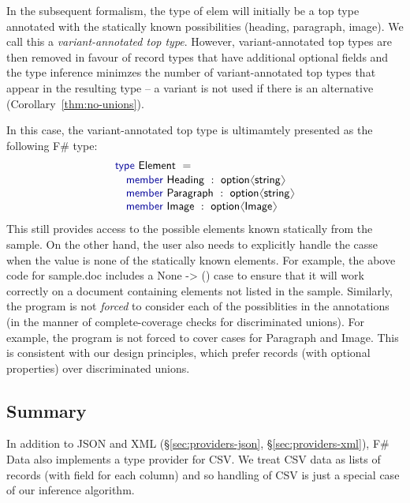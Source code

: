 \documentclass[10pt,preprint,blind,clearpagebib]{sigplanconf}
\newcommand{\langl}{\begin{picture}(4.5,7)
\put(1.1,2.5){\rotatebox{60}{\line(1,0){5.5}}}
\put(1.1,2.5){\rotatebox{300}{\line(1,0){5.5}}}
\end{picture}}
\newcommand{\rangl}{\begin{picture}(4.5,7)
\put(.9,2.5){\rotatebox{120}{\line(1,0){5.5}}}
\put(.9,2.5){\rotatebox{240}{\line(1,0){5.5}}}
\end{picture}}
\newcommand{\kvd}[1]{\textnormal{\textcolor{kvdclr}{\sffamily #1}}}
\newcommand{\strf}[1]{\textnormal{\textcolor{strclr}{\sffamily #1}}}
\newcommand{\ident}[1]{\textnormal{\sffamily #1}}
\begin{document}
In the subsequent formalism, the type of \ident{elem} will initially be a top type 
annotated with the statically known possibilities (heading, paragraph, image). 
We call this a \emph{variant-annotated top type}.
However, variant-annotated top types are then removed in favour of record types
that have additional optional fields and the type inference minimzes the number of 
variant-annotated top types that appear in the resulting type --
a variant is not used if there is an alternative (Corollary~\ref{thm:no-unions}).

In this case, the variant-annotated top type is ultimamtely presented as the following F\# type:
%
\begin{equation*}
\begin{array}{l}
 \kvd{type}~\ident{Element}~=  \\[0.1em]
 \quad \kvd{member}~\ident{Heading}~:~\ident{option}\langl \ident{string} \rangl\\
 \quad \kvd{member}~\ident{Paragraph}~:~\ident{option}\langl \ident{string} \rangl\\
 \quad \kvd{member}~\ident{Image}~:~\ident{option}\langl \ident{Image} \rangl\\
\end{array}
\end{equation*}
%
This still provides access to the possible elements known statically from the sample.
On the other hand, the user also needs to explicitly handle the casse when the value is none 
of the statically known elements. 
For example, the above code for  \strf{sample.doc} includes a \kvd{None -> ()} case to ensure that it will work 
correctly on a document containing elements not listed in the sample. Similarly, 
the program is not \emph{forced} to consider each of the possiblities in the annotations (in the manner
of complete-coverage checks for discriminated unions). For example,
the program is not forced to cover cases for  \ident{Paragraph} and \ident{Image}.  This is consistent
with our design principles, which prefer records (with optional properties) over discriminated unions.





\subsection{Summary}
In addition to JSON and XML (\S\ref{sec:providers-json}, \S\ref{sec:providers-xml}), F\# Data also 
implements a type provider for CSV. We treat CSV data as lists of records (with field for each 
column) and so handling of CSV is just a special case of our inference algorithm.
\end{document}
